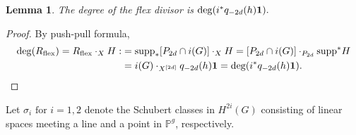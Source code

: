 \documentclass{amsart}
\newtheorem{lemma}[theorem]{Lemma}
\newtheorem{proposition}[theorem]{Proposition}
\theoremstyle{definition}
\begin{document}
%
%
%

\begin{lemma}\label{first-formula} The degree of the flex divisor is
${\rm deg}(i^*q_{-2d}(h){\bf 1}).$ \end{lemma} 

\begin{proof} By push-pull formula,
\begin{align*} {\rm deg}(R_{\rm flex})=R_{\rm flex}\cdot_X H :&= {\rm supp}_*[P_{2d}\cap i(G)]\cdot_X H
= [P_{2d}\cap i(G)]\cdot_{P_{2d}} {\rm supp}^*H \\ &=i(G)\cdot_{X^{[2d]}}  q_{-2d}(h){\bf 1} = {\rm deg}(i^*q_{-2d}(h){\bf 1}).\end{align*} \end{proof}


Let $\sigma_i\textrm{ for }i=1,2$ denote the
 Schubert classes in $H^{2i}(G)$ consisting of linear spaces
 meeting a line and a point in $\mathbb{P}^g$, respectively. 
\end{document}
